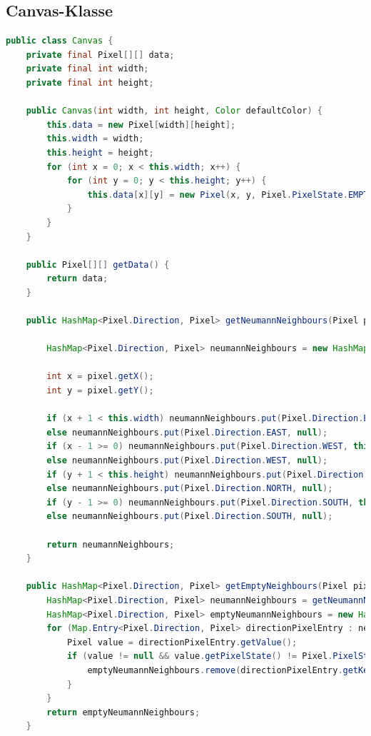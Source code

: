 \documentclass[a4paper,10pt,ngerman]{scrartcl}
\begin{document}
\newpage
\subsection{Canvas-Klasse}
\begin{lstlisting}[language=Java]
public class Canvas {
    private final Pixel[][] data;
    private final int width;
    private final int height;

    public Canvas(int width, int height, Color defaultColor) {
        this.data = new Pixel[width][height];
        this.width = width;
        this.height = height;
        for (int x = 0; x < this.width; x++) {
            for (int y = 0; y < this.height; y++) {
                this.data[x][y] = new Pixel(x, y, Pixel.PixelState.EMPTY, defaultColor);
            }
        }
    }

    public Pixel[][] getData() {
        return data;
    }

    public HashMap<Pixel.Direction, Pixel> getNeumannNeighbours(Pixel pixel) {

        HashMap<Pixel.Direction, Pixel> neumannNeighbours = new HashMap<>();

        int x = pixel.getX();
        int y = pixel.getY();

        if (x + 1 < this.width) neumannNeighbours.put(Pixel.Direction.EAST, this.data[x + 1][y]);
        else neumannNeighbours.put(Pixel.Direction.EAST, null);
        if (x - 1 >= 0) neumannNeighbours.put(Pixel.Direction.WEST, this.data[x - 1][y]);
        else neumannNeighbours.put(Pixel.Direction.WEST, null);
        if (y + 1 < this.height) neumannNeighbours.put(Pixel.Direction.NORTH, this.data[x][y + 1]);
        else neumannNeighbours.put(Pixel.Direction.NORTH, null);
        if (y - 1 >= 0) neumannNeighbours.put(Pixel.Direction.SOUTH, this.data[x][y - 1]);
        else neumannNeighbours.put(Pixel.Direction.SOUTH, null);

        return neumannNeighbours;
    }

    public HashMap<Pixel.Direction, Pixel> getEmptyNeighbours(Pixel pixel) {
        HashMap<Pixel.Direction, Pixel> neumannNeighbours = getNeumannNeighbours(pixel);
        HashMap<Pixel.Direction, Pixel> emptyNeumannNeighbours = new HashMap<>(neumannNeighbours);
        for (Map.Entry<Pixel.Direction, Pixel> directionPixelEntry : neumannNeighbours.entrySet()) {
            Pixel value = directionPixelEntry.getValue();
            if (value != null && value.getPixelState() != Pixel.PixelState.EMPTY) {
                emptyNeumannNeighbours.remove(directionPixelEntry.getKey());
            }
        }
        return emptyNeumannNeighbours;
    }


\end{lstlisting}
\end{document}
